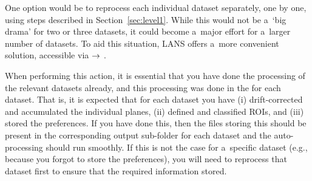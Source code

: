 One option would be to reprocess each individual dataset separately, one by one, using steps described in Section~\ref{sec:level1}. While this would not be a~`big drama' for two or three datasets, it could become a~major effort for a~larger number of datasets. To aid this situation, LANS offers a~more convenient solution, accessible via  $\rightarrow$ .

\goldbox{}
When performing this action, it is essential that you have done the  processing of the relevant datasets already, and this processing was done in the  for each dataset. That is, it is expected that for each dataset you have (i) drift-corrected and accumulated the individual planes, (ii) defined and classified ROIs, and (iii) stored the preferences. If you have done this, then the files storing this  should be present in the corresponding output sub-folder for each dataset and the auto-processing should run smoothly. If this is not the case for a~specific dataset (e.g., because you forgot to store the preferences), you will need to reprocess that dataset first to ensure that the required information  stored.
\tcbe







